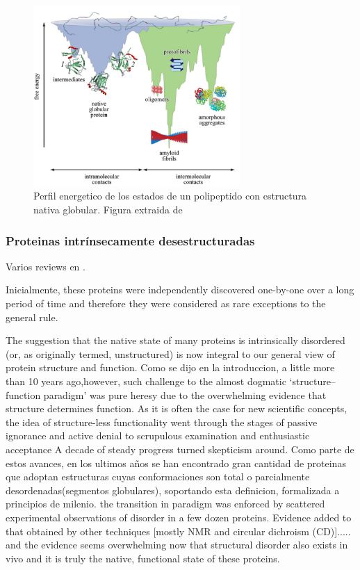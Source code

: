 \begin{figure}[htbp]
\centering
\includegraphics[width=0.7\textwidth]{img/globularEnLandscape.png} 
\caption{Perfil energetico de los estados de un polipeptido con estructura nativa globular. Figura extraida de \cite{turoverov2010protein}}
\label{globularEnergyLandscape}
\end{figure}



\subsubsection{Proteinas intrínsecamente desestructuradas}

Varios reviews en \cite{uversky2010understanding,dyson2005intrinsically}.

Inicialmente, these proteins were independently discovered one-by-one over a long period of time and therefore they were considered as rare exceptions to the general rule.

The suggestion that the native state of many proteins is intrinsically disordered (or, as originally termed, unstructured) is now integral to our general view of protein structure and function.
Como se dijo en la introduccion, a little more than 10 years ago,however, such challenge to the almost dogmatic ‘structure–function paradigm’ was pure heresy due to the overwhelming evidence that structure determines function.
As it is often the case for new scientific concepts, the idea of structure-less functionality went through the stages of passive ignorance and active denial to scrupulous examination and enthusiastic acceptance
A decade of steady progress turned skepticism around.
Como parte de estos avances, en los ultimos años se han encontrado gran cantidad de proteinas que adoptan estructuras cuyas conformaciones son total o parcialmente desordenadas(segmentos globulares), soportando esta definicion, formalizada a principios de milenio. 
the transition in paradigm was enforced by scattered experimental observations of disorder in a few dozen proteins. 
Evidence added to that obtained by other techniques [mostly NMR and circular dichroism (CD)]..... and the evidence seems overwhelming now that structural disorder also exists in vivo and it is truly the native, functional state of these proteins.


